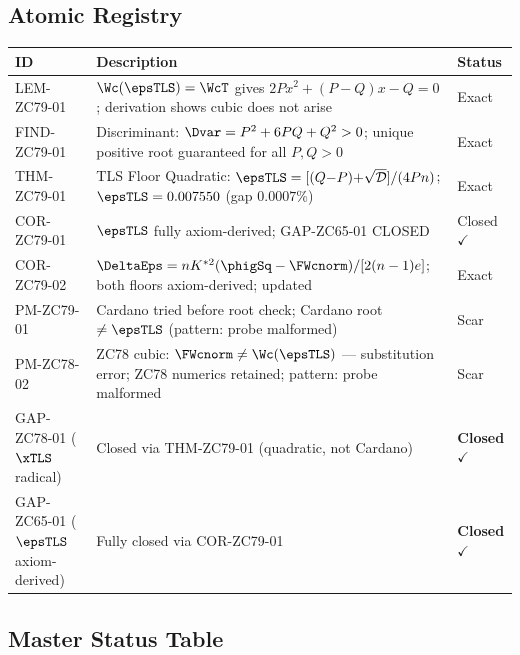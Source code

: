 \documentclass[12pt, a4paper]{article}
\begin{document}
\subsection{Atomic Registry}
\label{sec:registry}

\begin{formalbox}[title={Atomic Registry --- ZC79}]
\begin{center}
\renewcommand{\arraystretch}{1.3}
\scriptsize
\begin{tabular}{lp{6.0cm}p{2.8cm}}
\toprule
\textbf{ID} & \textbf{Description} & \textbf{Status} \\
\midrule
LEM-ZC79-01
  & $\Wc(\epsTLS)=\WcT$ gives $2Px^2+(P-Q)x-Q=0$;
    derivation shows cubic does not arise
  & Exact \\[3pt]
FIND-ZC79-01
  & Discriminant: $\Dvar = P^2+6PQ+Q^2 > 0$;
    unique positive root guaranteed for all $P,Q>0$
  & Exact \\[3pt]
THM-ZC79-01
  & TLS Floor Quadratic:
    $\epsTLS = [(Q{-}P){+}\sqrt{\mathcal{D}}]/(4Pn)$;
    $\epsTLS=0.007550$ (gap $0.0007\%$)
  & Exact \\[3pt]
COR-ZC79-01
  & $\epsTLS$ fully axiom-derived; GAP-ZC65-01 CLOSED
  & Closed $\checkmark$ \\[3pt]
COR-ZC79-02
  & $\DeltaEps = nK^{*2}(\phigSq-\FWcnorm)/[2(n-1)e]$;
    both floors axiom-derived; updated
  & Exact \\[3pt]
PM-ZC79-01
  & Cardano tried before root check; Cardano root $\neq\epsTLS$
    (pattern: probe malformed)
  & Scar \\[3pt]
PM-ZC78-02
  & ZC78 cubic: $\FWcnorm \neq \Wc(\epsTLS)$ — substitution error;
    ZC78 numerics retained; pattern: probe malformed
  & Scar \\[3pt]
\midrule
GAP-ZC78-01 ($\xTLS$ radical)
  & Closed via THM-ZC79-01 (quadratic, not Cardano)
  & \textbf{Closed} $\checkmark$ \\[3pt]
GAP-ZC65-01 ($\epsTLS$ axiom-derived)
  & Fully closed via COR-ZC79-01
  & \textbf{Closed} $\checkmark$ \\
\bottomrule
\end{tabular}
\end{center}
\end{formalbox}

\subsection{Master Status Table}
\label{sec:status}
\end{document}
